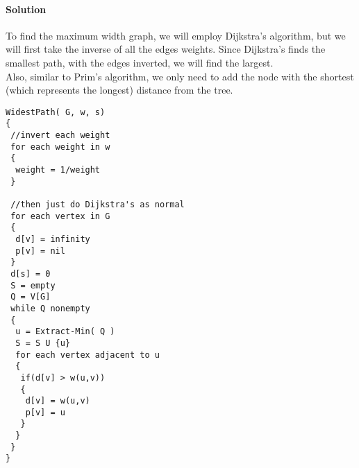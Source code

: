 \documentclass[12pt]{article}
\begin{document}

\paragraph{ Solution } 
To find the maximum width graph, we will employ Dijkstra's algorithm, but we will first take the inverse of all the edges weights.  Since Dijkstra's finds the smallest path, with the edges inverted, we will find the largest. \\
Also, similar to Prim's algorithm, we only need to add the node with the shortest (which represents the longest) distance from the tree. 

\begin{lstlisting}
WidestPath( G, w, s)
{
 //invert each weight
 for each weight in w
 {
  weight = 1/weight
 }
 
 //then just do Dijkstra's as normal
 for each vertex in G
 {
  d[v] = infinity
  p[v] = nil
 }
 d[s] = 0
 S = empty
 Q = V[G]
 while Q nonempty
 {
  u = Extract-Min( Q )
  S = S U {u}
  for each vertex adjacent to u
  {
   if(d[v] > w(u,v))
   {
    d[v] = w(u,v)
	p[v] = u
   }
  }
 }
}

\end{lstlisting}
\end{document}
